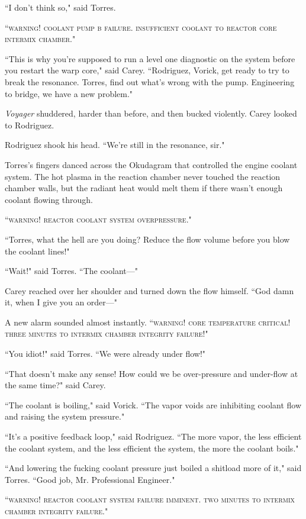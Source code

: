 \documentclass[twoside,letterpaper,12pt]{memoir}
\begin{document}
``I don't think so," said Torres.

``\textsc{warning! coolant pump b failure. insufficient coolant to reactor core intermix chamber}."

``This is why you're supposed to run a level one diagnostic on the system before you restart the warp core," said Carey. ``Rodriguez, Vorick, get ready to try to break the resonance. Torres, find out what's wrong with the pump. Engineering to bridge, we have a new problem."

\textit{Voyager} shuddered, harder than before, and then bucked violently. Carey looked to Rodriguez.

Rodriguez shook his head. ``We're still in the resonance, sir."

Torres's fingers danced across the Okudagram that controlled the engine coolant system. The hot plasma in the reaction chamber never touched the reaction chamber walls, but the radiant heat would melt them if there wasn't enough coolant flowing through.

``\textsc{warning! reactor coolant system overpressure}."

``Torres, what the hell are you doing? Reduce the flow volume before you blow the coolant lines!"

``Wait!" said Torres. ``The coolant---"

Carey reached over her shoulder and turned down the flow himself. ``God damn it, when I give you an order---"

A new alarm sounded almost instantly. ``\textsc{warning! core temperature critical! three minutes to intermix chamber integrity failure!}"

``You idiot!" said Torres. ``We were already under flow!"

``That doesn't make any sense! How could we be over-pressure and under-flow at the same time?" said Carey.

``The coolant is boiling," said Vorick. ``The vapor voids are inhibiting coolant flow and raising the system pressure."

``It's a positive feedback loop," said Rodriguez. ``The more vapor, the less efficient the coolant system, and the less efficient the system, the more the coolant boils."

``And lowering the fucking coolant pressure just boiled a shitload more of it," said Torres. ``Good job, Mr. Professional Engineer."

``\textsc{warning! reactor coolant system failure imminent. two minutes to intermix chamber integrity failure}."
\end{document}
